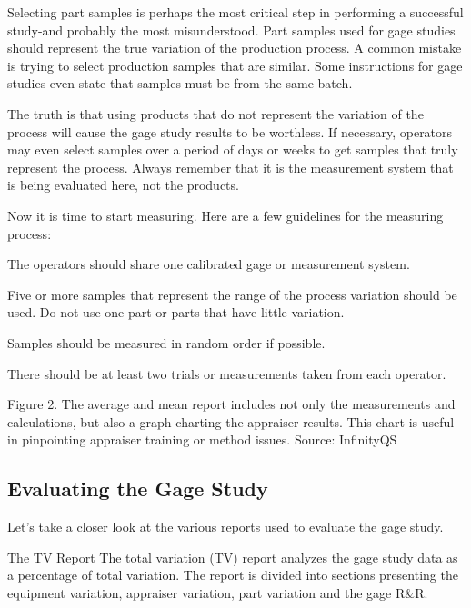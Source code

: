 Selecting part samples is perhaps the most critical step in performing a successful study-and probably the most misunderstood. Part samples used for gage studies should represent the true variation of the production process. A common mistake is trying to select production samples that are similar. Some instructions for gage studies even state that samples must be from the same batch. 

The truth is that using products that do not represent the variation of the process will cause the gage study results to be worthless. If necessary, operators may even select samples over a period of days or weeks to get samples that truly represent the process. Always remember that it is the measurement system that is being evaluated here, not the products. 

Now it is time to start measuring. Here are a few guidelines for the measuring process:


The operators should share one calibrated gage or measurement system.

Five or more samples that represent the range of the process variation should be used. Do not use one part or parts that have little variation. 

Samples should be measured in random order if possible. 

There should be at least two trials or measurements taken from each operator. 



Figure 2. The average and mean report includes not only the measurements and calculations, but also a graph charting the appraiser results. This chart is useful in pinpointing appraiser training or method issues. Source: InfinityQS


\subsection*{Evaluating the Gage Study}
Let’s take a closer look at the various reports used to evaluate the gage study.

The TV Report
The total variation (TV) report analyzes the gage study data as a percentage of total variation. The report is divided into sections presenting the equipment variation, appraiser variation, part variation and the gage R&R.

